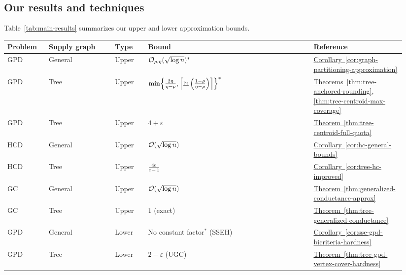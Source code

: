 \subsection{Our results and techniques}

Table~\ref{tab:main-results} summarizes our upper and lower approximation bounds.
\begin{table}[t]
\centering
\small
\setlength{\tabcolsep}{2pt}
\renewcommand{\arraystretch}{1.08}
\begin{tabular}{p{0.10\linewidth}p{0.16\linewidth}p{0.08\linewidth}p{0.40\linewidth}p{0.20\linewidth}}
\hline
Problem & Supply graph & Type & Bound & Reference \\
\hline
\textsc{GPD} & General & Upper & $\mathcal{O}_{\rho,\eta}(\sqrt{\log n})^{*}$ & \hyperref[cor:graph-partitioning-approximation]{Corollary~\ref*{cor:graph-partitioning-approximation}} \\
\textsc{GPD} & Tree & Upper & $\min\mathopen{}\left\{ \frac{2\eta}{\eta-\rho},\left\lceil\ln\left(\frac{1-\rho}{\eta-\rho}\right)\right\rceil \right\}^{*}$ & \hyperref[thm:tree-anchored-rounding]{Theorems~\ref*{thm:tree-anchored-rounding}}, \hyperref[thm:tree-centroid-max-coverage]{\ref*{thm:tree-centroid-max-coverage}} \\
\textsc{GPD} & Tree & Upper & $4+\varepsilon$ & \hyperref[thm:tree-centroid-full-quota]{Theorem~\ref*{thm:tree-centroid-full-quota}} \\
\textsc{HCD} & General & Upper & $\mathcal{O}(\sqrt{\log n})$ & \hyperref[cor:hc-general-bounds]{Corollary~\ref*{cor:hc-general-bounds}} \\
\textsc{HCD} & Tree & Upper & $\frac{4e}{e-1}$ & \hyperref[cor:tree-hc-improved]{Corollary~\ref*{cor:tree-hc-improved}} \\
\textsc{GC} & General & Upper & $\mathcal{O}(\sqrt{\log n})$ & \hyperref[thm:generalized-conductance-approx]{Theorem~\ref*{thm:generalized-conductance-approx}} \\
\textsc{GC} & Tree & Upper & $1$ (exact) & \hyperref[thm:tree-generalized-conductance]{Theorem~\ref*{thm:tree-generalized-conductance}} \\
\textsc{GPD} & General & Lower & No constant factor$^{*}$ (SSEH) & \hyperref[cor:sse-gpd-bicriteria-hardness]{Corollary~\ref*{cor:sse-gpd-bicriteria-hardness}} \\
\textsc{GPD} & Tree & Lower & $2-\varepsilon$ (UGC) & \hyperref[thm:tree-gpd-vertex-cover-hardness]{Theorem~\ref*{thm:tree-gpd-vertex-cover-hardness}} \\

\end{tabular}
\end{table}
